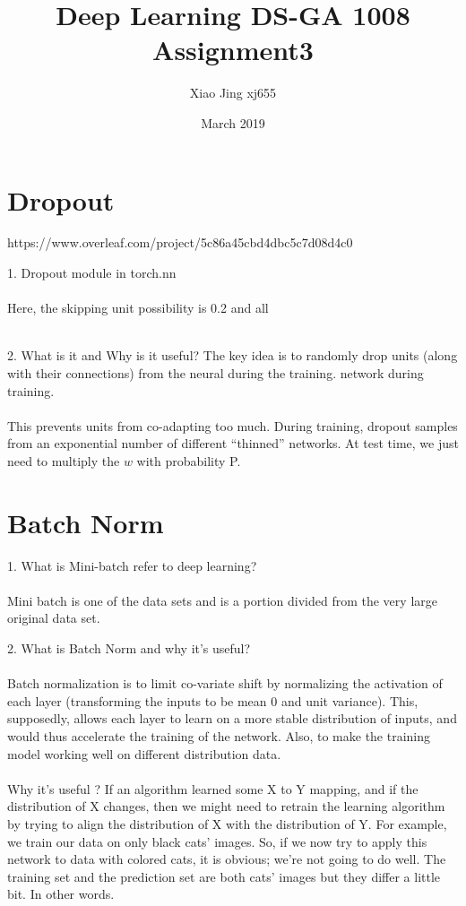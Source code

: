 \documentclass{article}
\title{Deep Learning DS-GA 1008  Assignment3}
\author{Xiao Jing xj655}
\date{March 2019}
\begin{document}
\maketitle

\section{Dropout}https://www.overleaf.com/project/5c86a45cbd4dbc5c7d08d4c0
\item{1. Dropout module in torch.nn}
\\
\\
Here, the skipping unit possibility is 0.2 and all
\\
\\


\item 2. What is it and Why is it useful?
The key idea is to randomly drop units (along with their connections) from the neural during the training.
network during training. 
\\
\\
This prevents units from co-adapting too much. During training,
dropout samples from an exponential number of different “thinned” networks. At test time, we just need to multiply the $w$ with probability P.

\section{Batch Norm}
\item  1. What is Mini-batch refer to deep learning?
\\
\\
Mini batch is one of the  data sets and is a portion divided from  the very large original data set.

\item 2. What is Batch Norm and why it's useful?
\\
\\
Batch normalization is to limit co-variate shift by normalizing the activation of each layer (transforming the inputs to be mean 0 and unit variance). This, supposedly, allows each layer to learn on a more stable distribution of inputs, and would thus accelerate the training of the network. Also, to make the training model working well on different distribution data.
\\
\\
Why it's useful ? If an algorithm learned some X to Y mapping, and if the distribution of X changes, then we might need to retrain the learning algorithm by trying to align the distribution of X with the distribution of Y. For example, we train our data on only black cats’ images. So, if we now try to apply this network to data with colored cats, it is obvious; we’re not going to do well. The training set and the prediction set are both cats’ images but they differ a little bit. In other words.
\end{document}
